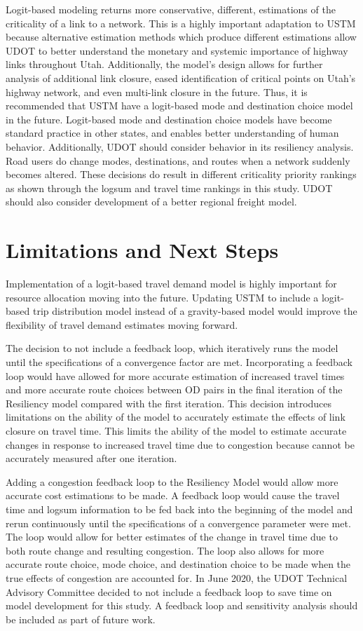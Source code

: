 Logit-based modeling returns more conservative, different,
estimations of the criticality of a link to a network. This is a highly
important adaptation to USTM because alternative estimation methods which produce
different estimations allow
UDOT to better understand the monetary and systemic importance of highway links
throughout Utah. Additionally, the model’s design allows for further
analysis of additional link closure, eased identification of critical
points on Utah's highway network, and even multi-link closure in the
future. Thus, it is recommended that USTM have a logit-based mode and destination
choice model in the future. Logit-based mode and destination choice models have
become standard practice in other states, and enables better understanding of
human behavior. Additionally, UDOT should consider behavior in its resiliency
analysis. Road users do change modes, destinations, and routes when a network
suddenly becomes altered. These decisions do result in different criticality
priority rankings as shown through the logsum and travel time rankings in this study.
UDOT should also consider development of a better regional freight model.

\section{Limitations and Next Steps}

Implementation of a logit-based travel demand model is highly important for
resource allocation moving into the future. Updating USTM to include a
logit-based trip distribution model instead of a gravity-based model would
improve the flexibility of travel demand estimates moving forward.

The decision to not include a feedback loop, which iteratively runs the model
until the specifications of a convergence factor are met. Incorporating a
feedback loop would have allowed for more accurate estimation of increased
travel times and more accurate route choices between OD pairs in the final
iteration of the Resiliency model compared with the first iteration.
This decision introduces limitations on the
ability of the model to accurately estimate the effects of link closure on
travel time. This limits the ability of the model to estimate accurate changes in
response to increased travel time due to congestion because cannot be
accurately measured after one iteration.

Adding a congestion feedback loop to the Resiliency Model would allow more
accurate cost estimations to be made. A feedback loop would cause the
travel time and logsum information to be fed back into the beginning of the
model and rerun continuously until the specifications of a convergence
parameter were met. The loop would allow for better estimates of the change
in travel time due to both route change and resulting congestion. The loop
also allows for more accurate route choice, mode choice, and destination
choice to be made when the true effects of congestion are accounted for.
In June 2020, the UDOT Technical Advisory Committee decided to not include a
feedback loop to save time
on model development for this study. A feedback loop and sensitivity analysis
should be included as part of future work.

